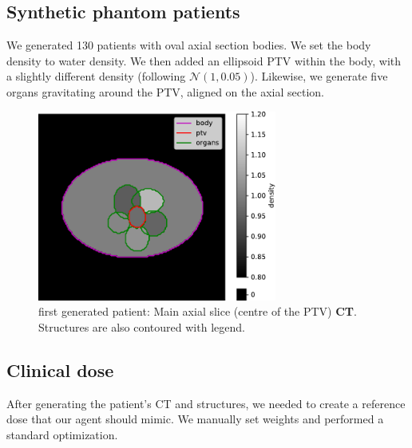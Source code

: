 \subsection*{Synthetic phantom patients}
We generated 130 patients with oval axial section bodies.
We set the body density to water density.
We then added an ellipsoid PTV within the body, with a slightly different density (following $\mathcal{N}(1,0.05)$).
Likewise, we generate five organs gravitating around the PTV, aligned on the axial section.

\begin{figure}
	\centering
	\includegraphics[width=0.7\textwidth]{main_slice-ct.pdf}
	\caption{first generated patient: Main axial slice (centre of the PTV) \textbf{CT}.\\ Structures are also contoured with legend.}
	\label{fig:main_slice-ct}
\end{figure}

\subsection*{Clinical dose}
After generating the patient's CT and structures, we needed to create a reference dose that our agent should mimic.
We manually set weights and performed a standard optimization.

